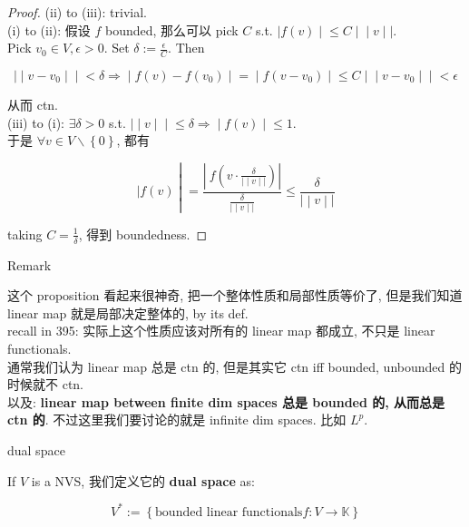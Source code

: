 \documentclass{qlnotes-export}
\begin{document}
\begin{proof}

(ii) to (iii): trivial.\\
(i) to (ii): 假设 \(f\) bounded, 那么可以 pick \(C\) s.t. \(\left. |f(v) \middle| \leq C \middle| \middle| v \middle| | \right.\).\\
Pick \(v_{0} \in V,\epsilon > 0\). Set \(\delta := \frac{\epsilon}{C}\). Then

\[\left. | \middle| v - v_{0} \middle| \middle| < \delta\Longrightarrow \middle| f(v) - f(v_{0}) \middle| = \middle| f(v - v_{0}) \middle| \leq C \middle| \middle| v - v_{0} \middle| \middle| < \epsilon \right.\]

从而 ctn.\\
(iii) to (i): \(\exists\delta > 0\) s.t. \(\left. | \middle| v \middle| \middle| \leq \delta\Longrightarrow \middle| f(v) \middle| \leq 1 \right.\).\\
于是 \(\forall v \in V\backslash\left\{ 0 \right\}\), 都有

\[\left. |f(v) \middle| = \frac{|\ f(v \cdot \frac{\delta}{\left. | \middle| v \middle| | \right.})|}{\frac{\delta}{\left. | \middle| v \middle| | \right.}} \leq \frac{\delta}{\left. | \middle| v \middle| | \right.} \right.\]

taking \(C = \frac{1}{\delta}\), 得到 boundedness.

\end{proof}

\begin{qlremark}{Remark}

这个 proposition 看起来很神奇, 把一个整体性质和局部性质等价了, 但是我们知道 linear map 就是局部决定整体的, by its def.\\
recall in 395: 实际上这个性质应该对所有的 linear map 都成立, 不只是 linear functionals.\\
通常我们认为 linear map 总是 ctn 的, 但是其实它 ctn iff bounded, unbounded 的时候就不 ctn.\\
以及: \textbf{linear map between finite dim spaces 总是 bounded 的, 从而总是 ctn 的}. 不过这里我们要讨论的就是 infinite dim spaces. 比如 \(L^{p}\).

\end{qlremark}

\begin{definition}{dual space}\label{def-13-the-dual-of-l-p-spaces-dual-space}

If \(V\) is a NVS, 我们定义它的 \textbf{dual space} as:

\[V^{\ast} := \left\{ {\text{bounded linear functionals} f:V\rightarrow{\mathbb{K}}} \right\}\]

\end{definition}
\end{document}

